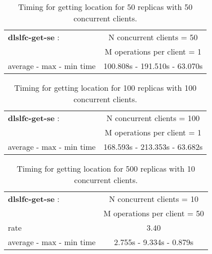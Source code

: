 \documentclass[pdftex]{cmspaper}
\begin{document}
\begin{table}[!htbp]
\begin{center}
 \begin{tabular}{|l|c|}
         \hline
   {\bf dlslfc-get-se} : & N concurrent clients = 50  \\ & M operations per client = 1\\ \hline
    average - max - min time     &  100.808s - 191.510s - 63.070s \\ \hline
\end{tabular}
\caption {Timing for getting location for 50 replicas with 50 concurrent clients.}\label{dlslfc-get-se}
\end{center}
\end{table}

\begin{table}[!htbp]
\begin{center}
 \begin{tabular}{|l|c|}         \hline
   {\bf dlslfc-get-se} : & N concurrent clients = 100 \\
                      & M operations per client = 1\\ \hline
    average - max - min time     &  168.593s - 213.353s - 63.682s \\ \hline
\end{tabular}
\caption {Timing for getting location for 100 replicas with 100 concurrent clients.}\label{dlslfc-get-se}
\end{center}
\end{table}

\begin{table}[!htbp]
\begin{center}
 \begin{tabular}{|l|c|}         \hline
   {\bf dlslfc-get-se} : & N concurrent clients = 10 \\ 
    & M operations per client = 50\\ \hline
    rate             & 3.40 \\ \hline
    average - max - min time     &  2.755s - 9.334s - 0.879s \\ \hline
\end{tabular}
\caption {Timing for getting location for 500 replicas with 10 concurrent clients.}\label{dlslfc-get-se}
\end{center}
\end{table}
\end{document}
